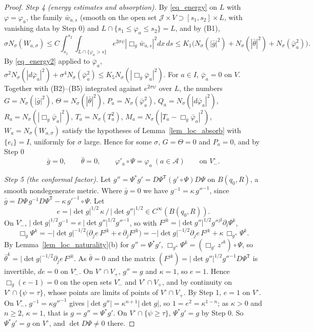 \documentclass[11pt,a4paper,reqno]{amsart}
\theoremstyle{definition}
\numberwithin{equation}{section}
\newcommand{\cA}{\mathcal{A}}
\newcommand{\cJ}{\mathcal{J}}
\newcommand{\bg}{\bar g}
\newcommand{\bth}{\bar\theta}
\newcommand{\bphi}{\bar\varphi}
\newcommand{\bw}{\bar w}
\begin{document}
\begin{proof}
\emph{Step 4 (energy estimates and absorption).} By \eqref{eq_energy} on $L$ with $\varphi=\varphi_a$, the family
$\bw_{a,s}$ (smooth on the open set $\cJ\times V\supset[s_1,s_2]\times L$, with vanishing data by Step 0) and
$L\cap\{s_1\le\varphi_a\le s_2\}=L$, and by (B1),
\[
\sigma N_\sigma(W_{a,\sigma})\le C\int_{s_1}^{s_2}\int_{L\cap\{\varphi_a>s\}}e^{2\sigma\psi}|\Box_g\bw_{a,s}|^2dx\,ds
\le K_1\bigl(N_\sigma(|\bg|^2)+N_\sigma(|\bth|^2)+N_\sigma(\bphi_a^2)\bigr).
\]
By \eqref{eq_energy2} applied to $\bphi_a$,
$\sigma^2N_\sigma(|d\bphi_a|^2)+\sigma^4N_\sigma(\bphi_a^2)\le K_5N_\sigma(|\Box_g\bphi_a|^2)$. For $a\in I$, $\bphi_a=0$ on $V$.
Together with (B2)--(B5) integrated against $e^{2\sigma\psi}$ over $L$, the numbers $G=N_\sigma(|\bg|^2)$,
$\Theta=N_\sigma(|\bth|^2)$, $P_a=N_\sigma(\bphi_a^2)$, $Q_a=N_\sigma(|d\bphi_a|^2)$, $R_a=N_\sigma(|\Box_g\bphi_a|^2)$,
$T_a=N_\sigma(T_a^2)$, $M_a=N_\sigma(|T_a-\Box_g\bphi_a|^2)$, $W_a=N_\sigma(W_{a,\sigma})$ satisfy the hypotheses of
Lemma~\ref{lem_loc_absorb} with $\{e_i\}=I$, uniformly for $\sigma$ large. Hence for some $\sigma$, $G=\Theta=0$ and
$P_a=0$, and by Step 0
\[
\bg=0,\qquad\bth=0,\qquad\varphi'_a\circ\Psi=\varphi_a\ (a\in\cA)\qquad\text{on }V^\circ_-.
\]

\emph{Step 5 (the conformal factor).} Let $g''=\Psi^*g'=D\Psi^{\mathsf T}(g'\circ\Psi)D\Psi$ on $B(q_0,R)$, a smooth
nondegenerate metric. Where $\bg=0$ we have $g^{-1}=\kappa\,g''^{-1}$, since $\bg=D\Psi\,g^{-1}D\Psi^{\mathsf T}-\kappa\,g'^{-1}\circ\Psi$.
Let
\[
e=|\det g|^{1/2}\,\kappa\,/\,|\det g''|^{1/2}\in C^\infty(B(q_0,R)).
\]
On $V^\circ_-$, $|\det g|^{1/2}g^{-1}=e\,|\det g''|^{1/2}g''^{-1}$, so with
$F^{jk}=|\det g''|^{1/2}g''^{jl}\partial_l\Psi^k$,
\[
\Box_g\Psi^k=-|\det g|^{-1/2}\bigl(\partial_je\,F^{jk}+e\,\partial_jF^{jk}\bigr)=-|\det g|^{-1/2}\partial_je\,F^{jk}+\kappa\,\Box_{g''}\Psi^k .
\]
By Lemma~\ref{lem_loc_naturality}(b) for $g''=\Psi^*g'$, $\Box_{g''}\Psi^k=(\Box_{g'}z'^k)\circ\Psi$, so
$\bth^k=|\det g|^{-1/2}\partial_je\,F^{jk}$. As $\bth=0$ and the matrix $(F^{jk})=|\det g''|^{1/2}g''^{-1}D\Psi^{\mathsf T}$ is
invertible, $de=0$ on $V^\circ_-$. On $V^\circ\cap V_+$, $g''=g$ and $\kappa=1$, so $e=1$. Hence $\Box_g(e-1)=0$ on the open
sets $V^\circ_-$ and $V^\circ\cap V_+$, and by continuity on $V^\circ\cap\{\psi=\tau\}$, whose points are limits of points of
$V^\circ\cap V_+$. By Step 1, $e=1$ on $V^\circ$. On $V^\circ_-$, $g^{-1}=\kappa g''^{-1}$ gives
$|\det g''|=\kappa^{n+1}|\det g|$, so $1=e^2=\kappa^{1-n}$; as $\kappa>0$ and $n\ge2$, $\kappa=1$, that is $g=g''=\Psi^*g'$. On
$V^\circ\cap\{\psi\ge\tau\}$, $\Psi^*g'=g$ by Step 0. So $\Psi^*g'=g$ on $V^\circ$, and $\det D\Psi\ne0$ there.


\end{proof}
\end{document}
